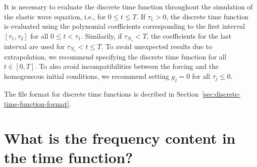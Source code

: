 \documentclass[11pt]{report}
\begin{document}
It is necessary to evaluate the discrete time function throughout the simulation of the elastic wave
equation, i.e., for $0\leq t\leq T$. If $\tau_1>0$, the discrete time function is evaluated using the
polynomial coefficients corresponding to the first interval $[\tau_1,\tau_2]$ for all
$0\leq t<\tau_1$. Similarily, if $\tau_{N_s}<T$, the coefficients for the last interval are used for
$\tau_{N_s}<t\leq T$. To avoid unexpected results due to extrapolation, we recommend specifying the
discrete time function for all $t\in[0,T]$. To also avoid incompatibilities between the forcing and
the homogeneous initial conditions, we recommend setting $g_j=0$ for all $\tau_j\leq 0$.

The file format for discrete time functions is decribed in
Section~\ref{sec:discrete-time-function-format}.


\section{What is the frequency content in the time function?}\label{sec:freq}
\end{document}
